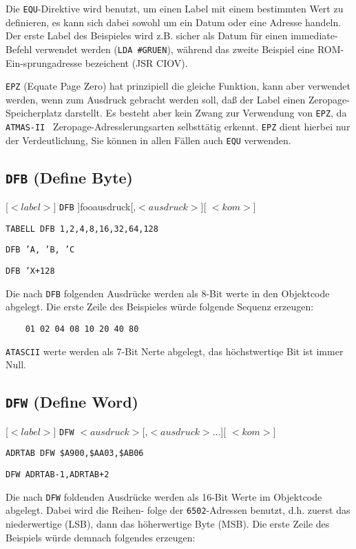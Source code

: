 \documentclass[10pt,a4paper,twoside,final,openright,titlepage]{memoir}
\newcommand{\foo}[1]{\ensuremath{< \!\! #1 \!\! >}}
\def\atmas{\texttt{AT\-MAS-II }}
\begin{document}
Die \texttt{EQU}-Direktive wird benutzt, um einen Label mit
einem bestimmten Wert zu definieren, es kann sich
dabei sowohl um ein Datum oder eine Adresse handeln.
Der erste Label des Beispieles wird z.B. sicher als
Datum für einen immediate-Befehl verwendet werden (\texttt{LDA \#GRUEN}), während das
zweite Beispiel eine ROM-Ein-sprungadresse bezeichent (JSR CIOV).

\texttt{EPZ} (Equate Page Zero) hat prinzipiell die gleiche
Funktion, kann aber verwendet werden, wenn zum
Ausdruck gebracht werden soll, daß der Label einen
Zeropage-Speicherplatz darstellt. Es besteht aber
kein Zwang zur Verwendung von \texttt{EPZ}, da \atmas
Zeropage-Adresslerungsarten selbsttätig erkennt. \texttt{EPZ}
dient hierbei nur der Verdeutlichung, Sie können in
allen Fällen auch \texttt{EQU} verwenden.

\subsection{\texttt{DFB} (Define Byte)}

		  {[\foo{label}] \texttt{DFB} ]foo{ausdruck}[,\foo{ausdruck}][ \foo{kom}]}
		  {
\texttt{TABELL 	DFB 1,2,4,8,16,32,64,128} \par
\texttt{DFB 'A, 'B, 'C} \par
\texttt{DFB 'X+128}
}

Die nach \texttt{DFB} folgenden Ausdrücke werden als 8-Bit
werte in den Objektcode abgelegt. Die erste Zeile des
Beispieles würde folgende Sequenz erzeugen:

\begin{Verbatim}
	01 02 04 08 10 20 40 80
\end{Verbatim}

\texttt{ATASCII} werte werden als 7-Bit Nerte abgelegt, das
höchstwertiqe Bit ist immer Null.

\subsection{\texttt{DFW} (Define Word)}

		  {[\foo{label}] \texttt{DFW} \foo{ausdruck}[,\foo{ausdruck}...][ \foo{kom}]}
		  {
\texttt{ADRTAB 	DFW \$A900,\$AA03,\$AB06} \par
\texttt{DFW ADRTAB-1,ADRTAB+2}
}

Die nach \texttt{DFW} foldenden Ausdrücke werden als 16-Bit
Werte im Objektcode abgelegt. Dabei wird die Reihen-
folge der \texttt{6502}-Adressen benutzt, d.h. zuerst das
niederwertige (LSB), dann das höherwertige Byte (MSB).
Die erste Zeile des Beispiels würde demnach folgendes
erzeugen:
\end{document}
